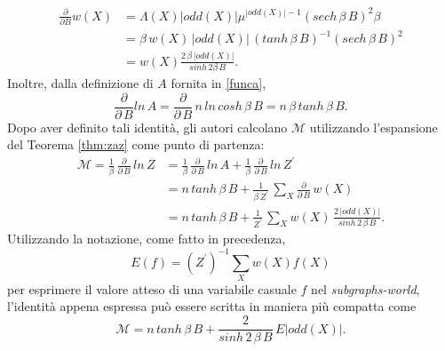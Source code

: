 \begin{align}
	\frac{\partial}{\partial B}w(X) &= \Lambda(X)|odd(X)|\mu^{|odd(X)|-1}(sech\,\beta\,B)^2 \beta\nonumber\\
	&= \beta\,w(X)\,|odd(X)|\,(tanh\,\beta\,B)^{-1}(sech\,\beta\,B)^2\\
	&= w(X) \frac{2\,\beta\,|odd(X)|}{sinh\,2\beta\,B}\nonumber.
\end{align}
Inoltre, dalla definizione di $A$ fornita in \ref{funca},
\begin{equation}
	\frac{\partial}{\partial\,B}ln\,A = \frac{\partial}{\partial\,B}\,n\,ln\,cosh\,\beta\,B = n\,\beta\,tanh\,\beta\,B.
\end{equation}
Dopo aver definito tali identità, gli autori calcolano $\mathcal{M}$ utilizzando l'espansione del Teorema \ref{thm:zaz} come punto di partenza:
\begin{align}
	\mathcal{M} = \frac{1}{\beta}\,\frac{\partial}{\partial\,B}\,ln\,Z &= \frac{1}{\beta}\,\frac{\partial}{\partial\,B}\,ln\,A + \frac{1}{\beta}\,\frac{\partial}{\partial\,B}\,ln\,Z^\prime\nonumber\\
	&= n\,tanh\,\beta\,B + \frac{1}{\beta\,Z^\prime}\,\sum_X{\frac{\partial}{\partial\,B}\,w(X)}\\
	&= n\,tanh\,\beta\,B + \frac{1}{Z^\prime}\,\sum_X{w(X)\,\frac{2\,|odd(X)|}{sinh\,2\,\beta\,B}}\nonumber.
\end{align}
Utilizzando la notazione, come fatto in precedenza,
\begin{equation}
	E(f) = (Z^\prime)^{-1}\sum_X{w(X)f(X)}
\end{equation}
per esprimere il valore atteso di una variabile casuale $f$ nel \textit{subgraphs-world}, l'identità appena espressa può essere scritta in maniera più compatta come
\begin{equation}
	\mathcal{M} = n\,tanh\,\beta\,B + \frac{2}{sinh\,2\,\beta\,B}\,E|odd(X)|.
	\label{m_compact}
\end{equation}
